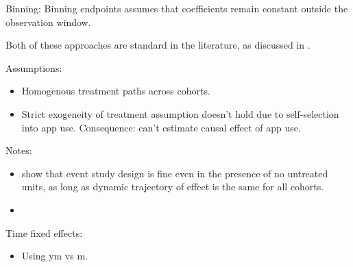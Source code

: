 

Binning:
Binning endpoints assumes that coefficients remain constant
outside the observation window.

Both of these approaches are standard in the
literature, as discussed in \citet{sun2021estimating, schmidheiny2019event}.

Assumptions:
\begin{itemize}
    \item Homogenous treatment paths across cohorts.

    \item Strict exogeneity of treatment assumption doesn't hold due to
        self-selection into app use. Consequence: can't estimate causal effect
        of app use.
\end{itemize}

Notes:
\begin{itemize}
    \item \citet{sun2021estimating} show that event study design is fine even
        in the presence of no untreated units, as long as dynamic trajectory of
        effect is the same for all cohorts.

    \item 
\end{itemize}

Time fixed effects:
\begin{itemize}
    \item Using ym vs m.
\end{itemize}


